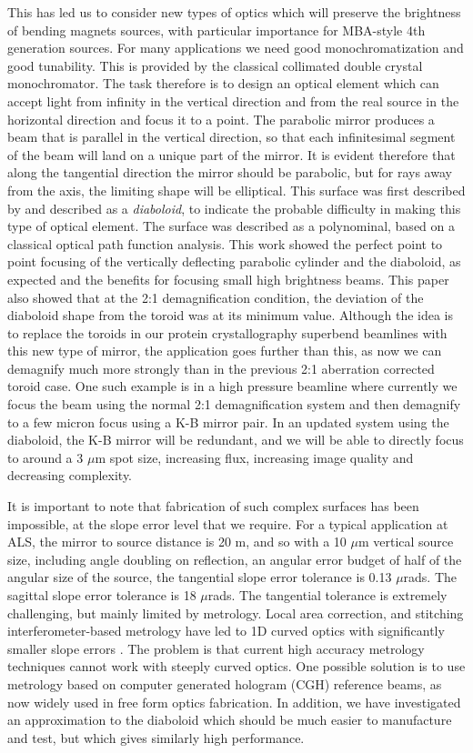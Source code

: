\documentclass{iucr}              %
\begin{document}
This has led us to consider new types of optics which will preserve the brightness of bending magnets sources, with particular importance for MBA-style 4th generation sources.   
For many applications we need good monochromatization and good tunability.  This is provided by the classical collimated double crystal monochromator.  The task therefore is to design an optical element which can accept light from infinity in the vertical direction and from the real source in the horizontal direction and focus it to a point.  The parabolic mirror produces a beam that is parallel in the vertical direction, so that each infinitesimal segment of the beam will land on a unique part of the mirror.  It is evident therefore that along the tangential direction the mirror should be parabolic, but for rays away from the axis, the limiting shape will be elliptical. 
This surface was first described by \cite{McKinneySPIE2009} and described as a {\it diaboloid}, to indicate the probable difficulty in making this type of optical element.  The surface was described as a polynominal, based on a classical optical path function analysis.  This work showed the perfect point to point focusing of the vertically deflecting parabolic cylinder and the diaboloid, as expected and the benefits for focusing small high brightness beams.  This paper also showed that at the 2:1 demagnification condition, the deviation of the diaboloid shape from the toroid was at its minimum value. Although the idea is to replace the toroids in our protein crystallography superbend beamlines with this new type of mirror, the application goes further than this, as now we can demagnify much more strongly than in the previous 2:1 aberration corrected toroid case.  One such example is in a high pressure beamline where currently we focus the beam using the normal 2:1 demagnification system and then demagnify to a few micron focus using a K-B mirror pair.  In an updated system using the diaboloid, the K-B mirror will be redundant, and we will be able to directly focus to around a 3 $\mu$m spot size, increasing flux, increasing image quality and decreasing complexity.

It is important to note that fabrication of such complex surfaces has been impossible, at the slope error level that we require.  For a typical application at ALS, the mirror to source distance is 20 m, and so with a 10 $\mu$m vertical source size, including angle doubling on reflection, an angular error budget of half of the angular size of the source, the tangential slope error tolerance is 0.13 $\mu$rads.  The sagittal slope error tolerance is 18 $\mu$rads.  The tangential tolerance is extremely challenging, but mainly limited by metrology.  Local area correction, and stitching interferometer-based metrology have led to 1D curved optics with significantly smaller slope errors \cite{Yamauchi2002}.  The problem is that current high accuracy metrology techniques cannot work with steeply curved optics.  One possible solution is to use metrology based on computer generated hologram (CGH) reference beams, as now widely used in free form optics fabrication. In addition, we have investigated an approximation to the diaboloid which should be much easier to manufacture and test, but which gives similarly high performance. 
\end{document}
